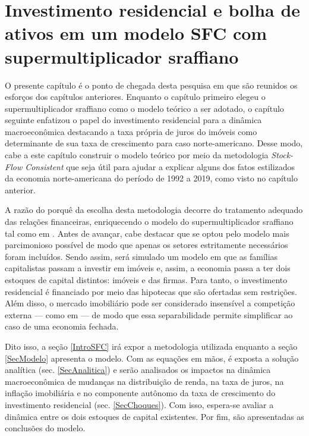 \chapter{Investimento residencial e bolha de ativos em um modelo SFC com supermultiplicador sraffiano}\label{CapModelo}


O presente capítulo é o ponto de chegada desta pesquisa em que são reunidos os esforços dos capítulos anteriores. Enquanto o capítulo primeiro elegeu o supermultiplicador sraffiano como o modelo teórico a ser adotado, o capítulo seguinte  enfatizou o papel do investimento residencial para a dinâmica macroeconômica destacando a taxa própria de juros do imóveis como determinante de sua taxa de crescimento para caso norte-americano. Desse modo, cabe a este capítulo construir o modelo teórico por meio da metodologia \textit{Stock-Flow Consistent}  que seja útil para ajudar a explicar alguns dos fatos estilizados da economia norte-americana do período de 1992 a 2019, como visto no capítulo anterior.

A razão do porquê da escolha desta metodologia decorre do tratamento adequado das relações financeiras, enriquecendo o modelo do supermultiplicador sraffiano tal como em \textcite{brochier_supermultiplier_2018}. Antes de avançar, cabe destacar que se optou pelo modelo mais parcimonioso possível de modo que apenas os setores estritamente necessários foram incluídos. Sendo assim, será simulado um modelo em que as famílias capitalistas passam a investir em imóveis e, assim, a economia passa a ter dois estoques de capital distintos: imóveis e das firmas. Para tanto, o investimento residencial é financiado por meio das hipotecas que são ofertadas sem restrições. 
Além disso, o mercado imobiliário pode ser considerado insensível a competição externa --- como em \textcite{duesenberry_investment_1958} --- de modo que essa separabilidade permite simplificar ao caso de uma economia fechada.


Dito isso, a seção \ref{IntroSFC} irá expor a metodologia utilizada enquanto a seção \ref{SecModelo} apresenta o modelo. Com as equações em mãos, é exposta a solução analítica (sec. \ref{SecAnalitica}) e serão analisados os impactos na dinâmica macroeconômica de mudanças na distribuição de renda, na taxa de juros, na inflação imobiliária e no componente autônomo da taxa de crescimento do investimento residencial (sec. \ref{SecChoques}). Com isso, espera-se avaliar a dinâmica entre os dois estoques de capital existentes.
Por fim, são apresentadas as conclusões do modelo.






